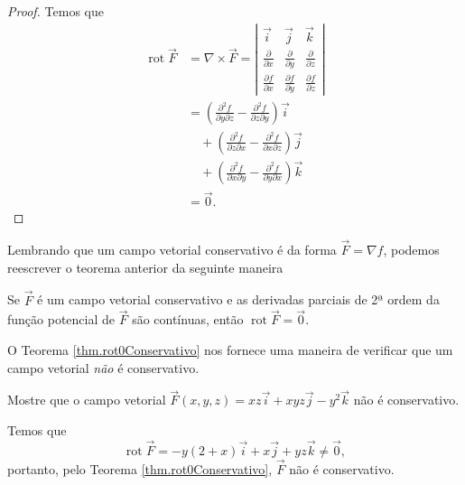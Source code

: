\begin{proof}
    Temos que
        \begin{align*}
            \operatorname{rot}\overrightarrow{F}
                & = \nabla \times \overrightarrow{F} = \left|\begin{matrix}
    \overrightarrow{i} & \overrightarrow{j} & \overrightarrow{k}  \\
    \frac{\partial}{\partial x} & \frac{\partial}{\partial y} & \frac{\partial}{\partial z} \\
    \frac{\partial f}{\partial x} & \frac{\partial f}{\partial y} & \frac{\partial f}{\partial z}
\end{matrix}\right|\\
                & = \left( \frac{\partial^2 f}{\partial y \partial z} - \frac{\partial^2 f}{\partial z \partial y} \right)\overrightarrow{i} \\
                & \quad + \left( \frac{\partial^2 f}{\partial z \partial x} - \frac{\partial^2 f}{\partial x \partial z} \right)\overrightarrow{j} \\
                & \quad + \left( \frac{\partial^2 f}{\partial x \partial y} - \frac{\partial^2 f}{\partial y \partial x} \right)\overrightarrow{k} \\
                & = \overrightarrow{0}.
        \end{align*}
\end{proof}

Lembrando que um campo vetorial conservativo é da forma \(\overrightarrow{F} = \nabla f\), podemos reescrever o teorema anterior da seguinte maneira

\begin{theorem}\label{thm.rot0Conservativo}
    Se \(\overrightarrow{F}\) é um campo vetorial conservativo e as derivadas parciais de 2ª ordem da função potencial de \(\overrightarrow{F}\) são contínuas, então \(\operatorname{rot}\overrightarrow{F} = \overrightarrow{0}\).
\end{theorem}

\begin{remark}
    O Teorema \ref{thm.rot0Conservativo} nos fornece uma maneira de verificar que um campo vetorial \textit{não} é conservativo.
\end{remark}

\begin{example}
    Mostre que o campo vetorial \(\overrightarrow{F}(x,y,z) = xz\overrightarrow{i} + xyz\overrightarrow{j} - y^2\overrightarrow{k}\) não é conservativo.

    Temos que \[\operatorname{rot}\overrightarrow{F} = -y(2+x)\overrightarrow{i} + x\overrightarrow{j} + yz\overrightarrow{k} \neq \overrightarrow{0},\] portanto, pelo Teorema \ref{thm.rot0Conservativo}, \(\overrightarrow{F}\) não é conservativo.
\end{example}

